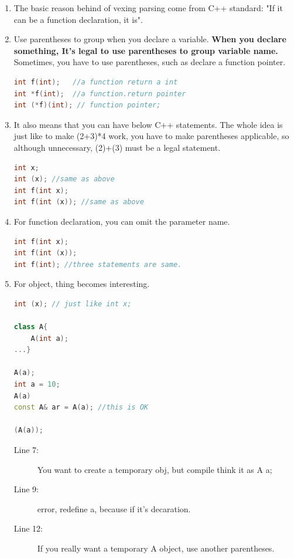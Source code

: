 \documentclass[a4paper,11pt,twoside]{book}
\begin{document}
\begin{enumerate}
	\item The basic reason behind of vexing parsing come from C++ standard: "If it can be a function declaration, it is".
	
	\item Use parentheses to group when you declare a variable. \textbf{When you declare something, It's legal to use parentheses to group variable name.} Sometimes, you have to use parentheses, such as declare a function pointer. 
\begin{lstlisting}[frame=single, language=c++, mathescape=true]
int f(int);   //a function return a int
int *f(int);  //a function.return pointer
int (*f)(int); // function pointer;  
\end{lstlisting}
	
	\item It also means that you can have below C++ statements. The whole idea is just like to make (2+3)*4 work, you have to make parentheses applicable, so although unnecessary, (2)+(3) must be a legal statement.
\begin{lstlisting}[frame=single, language=c++, mathescape=true]
int x;
int (x); //same as above
int f(int x);
int f(int (x)); //same as above
\end{lstlisting}
	
	\item For function declaration, you can omit the parameter name.  
\begin{lstlisting}[frame=single, language=c++, mathescape=true]
int f(int x);
int f(int (x));
int f(int); //three statements are same. 
\end{lstlisting}
	
	\item For object, thing becomes interesting.
\begin{lstlisting}[frame=single, language=c++, mathescape=true]
int (x); // just like int x;

class A{
	A(int a);
...}
	
A(a);  
int a = 10;
A(a)  
const A& ar = A(a); //this is OK

(A(a)); 
\end{lstlisting}
\begin{description}
	\item[Line 7:] You want to create a temporary obj, but compile think it as A a;
	\item[Line 9:] error, redefine a, because if it's decaration.
	\item[Line 12:] If you really want a temporary A object, use another parentheses. 
\end{description}
	

\end{enumerate}
\end{document}
